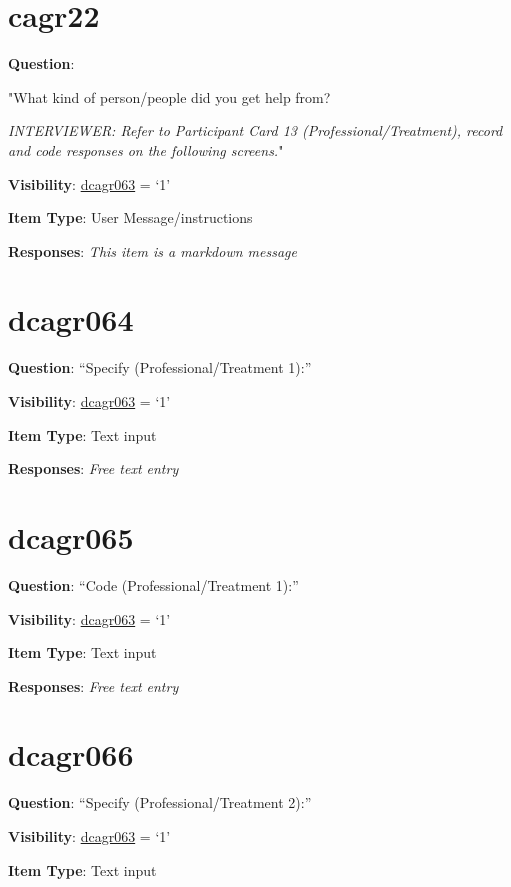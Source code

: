 \documentclass[]{book}
\begin{document}
\hypertarget{cagr22}{%
\section{cagr22}\label{cagr22}}

\textbf{Question}:

"What kind of person/people did you get help from?

\emph{INTERVIEWER: Refer to Participant Card 13 (Professional/Treatment), record and code responses on the following screens.}"

\textbf{Visibility}: \protect\hyperlink{dcagr063}{dcagr063} = `1'

\textbf{Item Type}: User Message/instructions

\textbf{Responses}: \emph{This item is a markdown message}

\hypertarget{dcagr064}{%
\section{dcagr064}\label{dcagr064}}

\textbf{Question}: ``Specify (Professional/Treatment 1):''

\textbf{Visibility}: \protect\hyperlink{dcagr063}{dcagr063} = `1'

\textbf{Item Type}: Text input

\textbf{Responses}: \emph{Free text entry}

\hypertarget{dcagr065}{%
\section{dcagr065}\label{dcagr065}}

\textbf{Question}: ``Code (Professional/Treatment 1):''

\textbf{Visibility}: \protect\hyperlink{dcagr063}{dcagr063} = `1'

\textbf{Item Type}: Text input

\textbf{Responses}: \emph{Free text entry}

\hypertarget{dcagr066}{%
\section{dcagr066}\label{dcagr066}}

\textbf{Question}: ``Specify (Professional/Treatment 2):''

\textbf{Visibility}: \protect\hyperlink{dcagr063}{dcagr063} = `1'

\textbf{Item Type}: Text input
\end{document}
